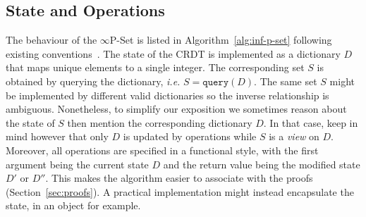 \documentclass[11pt, oneside]{article}   	%
\begin{document}
\subsection{State and Operations}
\label{sec:data-type}

The behaviour of the $\infty$P-Set is listed in Algorithm~\ref{alg:inf-p-set} following existing conventions~\cite{shapiro:inria-00555588}.  The state of the CRDT is implemented as a dictionary $D$ that 
maps unique elements to a single integer. The corresponding set $S$ is obtained by querying the dictionary, \textit{i.e.} $S=\texttt{query}(D)$. The same set $S$ might be implemented by different valid dictionaries so the inverse relationship is ambiguous. Nonetheless, to simplify our exposition we sometimes reason about the state of $S$ then mention the corresponding dictionary $D$. In that case, keep in mind however that only $D$ is updated by operations while $S$ is a \textit{view} on $D$. Moreover, all operations are specified in a functional style, with the first argument being the current state $D$ and the return value being the modified state $D'$ or $D''$. This makes the algorithm easier to associate with the proofs (Section~\ref{sec:proofs}). A practical implementation might instead encapsulate the state, in an object for example.
\end{document}
